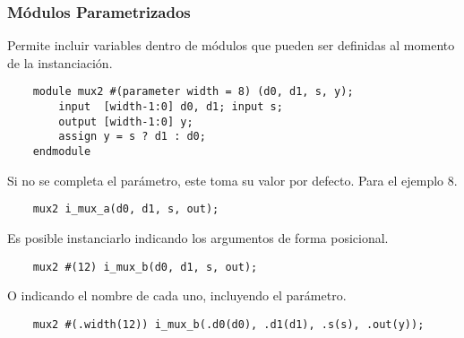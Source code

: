 \documentclass[aspectratio=169]{beamer}
\begin{document}
\begin{frame}[fragile,t]
    \frametitle{Módulos Parametrizados}
    \small
    Permite incluir variables dentro de módulos que pueden ser definidas al momento de la instanciación.\\
\begin{lstlisting}
    module mux2 #(parameter width = 8) (d0, d1, s, y);
        input  [width-1:0] d0, d1; input s;
        output [width-1:0] y;
        assign y = s ? d1 : d0;        
    endmodule
\end{lstlisting}
    \pause
    Si no se completa el parámetro, este toma su valor por defecto. Para el ejemplo 8.\\
\begin{lstlisting}
    mux2 i_mux_a(d0, d1, s, out);
\end{lstlisting}
    \pause
    Es posible instanciarlo indicando los argumentos de forma posicional.\\
\begin{lstlisting}
    mux2 #(12) i_mux_b(d0, d1, s, out);
\end{lstlisting}
    \pause
    O indicando el nombre de cada uno, incluyendo el parámetro.\\
\begin{lstlisting}
    mux2 #(.width(12)) i_mux_b(.d0(d0), .d1(d1), .s(s), .out(y));
\end{lstlisting}
\end{frame}
\end{document}
